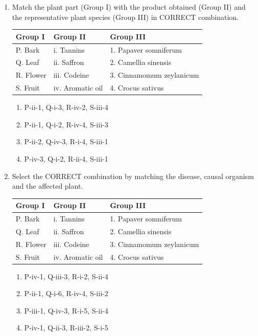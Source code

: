 \documentclass[journal,12pt,onecolumn]{IEEEtran}
\begin{document}
\begin{enumerate}[label=\arabic*.]
\item Match the plant part (Group I) with the product obtained (Group II) and the representative plant species (Group III) in CORRECT combination.
\newpage
\noindent
\begin{tabular}{|l|l|l|}
\hline
\textbf{Group I} & \textbf{Group II} & \textbf{Group III} \\
\hline
P. Bark   & i. Tannins        & 1. Papaver somniferum \\
Q. Leaf   & ii. Saffron       & 2. Camellia sinensis \\
R. Flower & iii. Codeine      & 3. Cinnamomum zeylanicum \\
S. Fruit  & iv. Aromatic oil  & 4. Crocus sativus \\
\hline
\end{tabular}
\begin{multicols}{2}
\begin{enumerate}[label=(\Alph*)]
    \item P-ii-1, Q-i-3, R-iv-2, S-iii-4
    \item P-ii-1, Q-i-2, R-iv-4, S-iii-3
    \item P-ii-2, Q-iv-3, R-i-4, S-iii-1
    \item P-iv-3, Q-i-2, R-ii-4, S-iii-1
\end{enumerate}
\end{multicols}

\item Select the CORRECT combination by matching the disease, causal organism and the affected plant.

\noindent
\begin{tabular}{|l|l|l|}
\hline
\textbf{Group I} & \textbf{Group II} & \textbf{Group III} \\
\hline
P. Bark   & i. Tannins        & 1. Papaver somniferum \\
Q. Leaf   & ii. Saffron       & 2. Camellia sinensis \\
R. Flower & iii. Codeine      & 3. Cinnamomum zeylanicum \\
S. Fruit  & iv. Aromatic oil  & 4. Crocus sativus \\
\hline
\end{tabular}
\begin{multicols}{2}
\begin{enumerate}[label=(\Alph*)]
    \item P-iv-1, Q-iii-3, R-i-2, S-ii-4
    \item P-ii-1, Q-i-6, R-iv-4, S-iii-2
    \item P-iii-1, Q-iv-3, R-i-5, S-ii-4
    \item P-iv-1, Q-ii-3, R-iii-2, S-i-5
\end{enumerate}
\end{multicols}


\end{enumerate}
\end{document}

